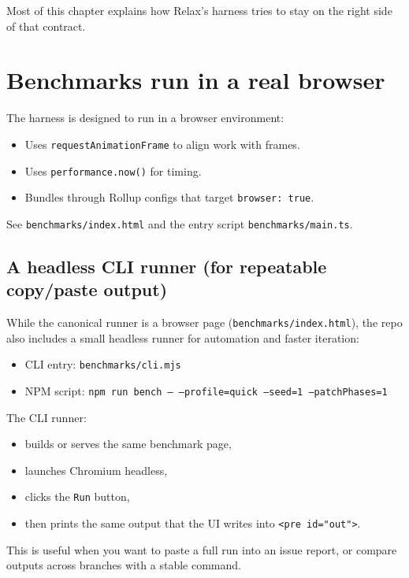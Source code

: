 Most of this chapter explains how Relax's harness tries to stay on the right side of that contract.

\section{Benchmarks run in a real browser}

The harness is designed to run in a browser environment:

\begin{itemize}
\item Uses \texttt{requestAnimationFrame} to align work with frames.
\item Uses \texttt{performance.now()} for timing.
\item Bundles through Rollup configs that target \texttt{browser: true}.
\end{itemize}

See \texttt{benchmarks/index.html} and the entry script \texttt{benchmarks/main.ts}.

\subsection{A headless CLI runner (for repeatable copy/paste output)}

While the canonical runner is a browser page (\texttt{benchmarks/index.html}), the repo also includes a small headless runner for automation and faster iteration:

\begin{itemize}
\item CLI entry: \texttt{benchmarks/cli.mjs}
\item NPM script: \texttt{npm run bench -- --profile=quick --seed=1 --patchPhases=1}
\end{itemize}

The CLI runner:

\begin{itemize}
\item builds or serves the same benchmark page,
\item launches Chromium headless,
\item clicks the \texttt{Run} button,
\item then prints the same output that the UI writes into \texttt{<pre id="out">}.
\end{itemize}

This is useful when you want to paste a full run into an issue report, or compare outputs across branches with a stable command.

